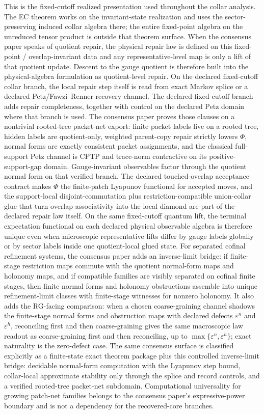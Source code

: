 This is the fixed-cutoff realized presentation used throughout the collar analysis. The EC theorem works on the invariant-state realization and uses the sector-preserving induced collar algebra there; the entire fixed-point algebra on the unreduced tensor product is outside that theorem surface.
When the consensus paper speaks of quotient repair, the physical repair law is defined on
this fixed-point / overlap-invariant data and any representative-level map is only a lift of that
quotient update. Descent to the gauge quotient is therefore built into the physical-algebra
formulation as quotient-level repair. On the
declared fixed-cutoff collar branch, the local repair step itself is read from exact Markov splice
or a declared Petz/Fawzi--Renner recovery channel. The declared fixed-cutoff branch adds
repair completeness, together with control on the declared Petz domain
where that branch is used. The consensus paper proves those clauses on a nontrivial rooted-tree
packet-net export: finite packet labels live on a rooted tree, hidden labels are quotient-only,
weighted parent-copy repair strictly lowers \(\Phi\), normal forms are exactly consistent packet
assignments, and the classical full-support Petz channel is CPTP and trace-norm contractive on
its positive-support-gap domain. Gauge-invariant observables factor through the quotient normal
form on that verified branch. The declared touched-overlap acceptance contract makes \(\Phi\) the
finite-patch Lyapunov functional for accepted moves, and the support-local disjoint-commutation
plus restriction-compatible union-collar glue that turn overlap associativity into the local
diamond are part of the declared repair law itself. On the same fixed-cutoff quantum lift, the
terminal expectation functional on each declared physical observable algebra is therefore unique
even when microscopic representative lifts differ by gauge labels globally or by sector labels
inside one quotient-local glued state.
For separated cofinal refinement systems, the consensus paper adds an inverse-limit bridge:
if finite-stage restriction maps commute with the quotient normal-form maps and holonomy maps,
and if compatible families are visibly separated on cofinal finite stages, then finite normal
forms and holonomy obstructions assemble into unique refinement-limit classes with finite-stage
witnesses for nonzero holonomy. It also adds the RG-facing comparison: when a chosen
coarse-graining channel shadows the finite-stage normal forms and obstruction maps with declared
defects \(\varepsilon^n\) and \(\varepsilon^h\), reconciling first and then coarse-graining gives
the same macroscopic law readout as coarse-graining first and then reconciling, up to
\(\max\{\varepsilon^n,\varepsilon^h\}\); exact naturality is the zero-defect case. The same
consensus surface is classified explicitly as a
finite-state exact theorem package plus this controlled inverse-limit bridge: decidable
normal-form computation with the Lyapunov step bound, collar-local approximate stability only
through the splice and record controls, and a verified rooted-tree packet-net subdomain.
Computational universality for growing patch-net families belongs to the consensus paper's
expressive-power boundary and is not a dependency for the recovered-core branches.

